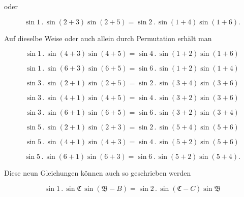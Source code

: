 
oder

\begin{equation}
\sin 1 \, . \, \sin(2+3)\sin(2+5) = \sin 2 \, . \, \sin(1+4)\sin(1+6).
\tag{3}
\end{equation}

Auf dieselbe Weise oder auch allein durch Permutation erhält man

\begin{equation}
\sin 1 \, . \, \sin(4+3)\sin(4+5) = \sin 4 \, . \, \sin(1+2)\sin(1+6)
\tag{4}
\end{equation}

\begin{equation}
\sin 1 \, . \, \sin(6+3)\sin(6+5) = \sin 6 \, . \, \sin(1+2)\sin(1+4)
\tag{5}
\end{equation}

\begin{equation}
\sin 3 \, . \, \sin(2+1)\sin(2+5) = \sin 2 \, . \, \sin(3+4)\sin(3+6)
\tag{6}
\end{equation}

\begin{equation}
\sin 3 \, . \, \sin(4+1)\sin(4+5) = \sin 4 \, . \, \sin(3+2)\sin(3+6)
\tag{7}
\end{equation}

\begin{equation}
\sin 3 \, . \, \sin(6+1)\sin(6+5) = \sin 6 \, . \, \sin(3+2)\sin(3+4)
\tag{8}
\end{equation}

\begin{equation}
\sin 5 \, . \, \sin(2+1)\sin(2+3) = \sin 2 \, . \, \sin(5+4)\sin(5+6)
\tag{9}
\end{equation}

\begin{equation}
\sin 5 \, . \, \sin(4+1)\sin(4+3) = \sin 4 \, . \, \sin(5+2)\sin(5+6)
\tag{10}
\end{equation}

\begin{equation}
\sin 5 \, . \, \sin(6+1)\sin(6+3) = \sin 6 \, . \, \sin(5+2)\sin(5+4).
\tag{11}
\end{equation}

Diese neun Gleichungen können auch so geschrieben werden

\begin{equation}
\sin 1 \, . \, \sin\mathfrak{C} \, \sin(\mathfrak{B}-B) = \sin 2 \, . \, \sin(\mathfrak{C}-C)\sin\mathfrak{B}
\tag{3}
\end{equation}

